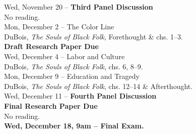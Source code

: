 \documentclass [11pt]{article}
\begin{document}
\noindent
Wed, November 20 -- \textbf{Third Panel Discussion} \\
\phantom{Wed, November 20 -- }No reading. \\

\noindent
Mon, December 2 -- The Color Line \\
\phantom{Mon, December 2 -- }DuBois, \textit{The Souls of Black Folk}, Forethought \& chs. 1--3. \\
\phantom{Mon, December 2 -- }\textbf{Draft Research Paper Due} \\

\noindent
Wed, December 4 -- Labor and Culture \\
\phantom{Wed, December 4 -- }DuBois, \textit{The Souls of Black Folk}, chs. 6, 8--9. \\

\noindent
Mon, December 9 -- Education and Tragedy \\
\phantom{Mon, December 9 -- }DuBois, \textit{The Souls of Black Folk}, chs. 12--14 \& Afterthought. \\

\noindent
Wed, December 11 -- \textbf{Fourth Panel Discussion} \\
\phantom{Wed, December 11 -- }\textbf{Final Research Paper Due} \\
\phantom{Wed, December 11 -- }No reading. \\

\textbf{Wed, December 18, 9am -- Final Exam.}
\end{document}
